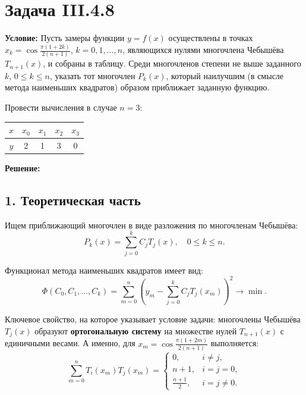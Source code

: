 \documentclass{article}
\begin{document}
\section*{Задача III.4.8}

\textbf{Условие:} Пусть замеры функции $y = f(x)$ осуществлены в точках $x_k = \cos\frac{\pi(1+2k)}{2(n+1)}$, $k = 0, 1, \ldots, n$, являющихся нулями многочлена Чебышёва $T_{n+1}(x)$, и собраны в таблицу. Среди многочленов степени не выше заданного $k$, $0 \le k \le n$, указать тот многочлен $P_k(x)$, который наилучшим (в смысле метода наименьших квадратов) образом приближает заданную функцию.

Провести вычисления в случае $n = 3$:

\begin{center}
\begin{tabular}{|c|c|c|c|c|}
\hline
$x$ & $x_0$ & $x_1$ & $x_2$ & $x_3$ \\
\hline
$y$ & 2 & 1 & 3 & 0 \\
\hline
\end{tabular}
\end{center}

\vspace{0.5cm}
\textbf{Решение:}

\subsection*{1. Теоретическая часть}

Ищем приближающий многочлен в виде разложения по многочленам Чебышёва:
\begin{equation}
P_k(x) = \sum_{j=0}^{k} C_j T_j(x), \quad 0 \le k \le n.
\label{eq:48_pk}
\end{equation}

Функционал метода наименьших квадратов имеет вид:
\begin{equation}
\Phi(C_0, C_1, \ldots, C_k) = \sum_{m=0}^{n} \left(y_m - \sum_{j=0}^{k} C_j T_j(x_m)\right)^2 \to \min.
\end{equation}

Ключевое свойство, на которое указывает условие задачи: многочлены Чебышёва $T_j(x)$ образуют \textbf{ортогональную систему} на множестве нулей $T_{n+1}(x)$ с единичными весами. А именно, для $x_m = \cos\frac{\pi(1+2m)}{2(n+1)}$ выполняется:
\begin{equation}
\sum_{m=0}^{n} T_i(x_m) T_j(x_m) = 
\begin{cases} 
0, & i \neq j, \\
n+1, & i = j = 0, \\
\frac{n+1}{2}, & i = j \neq 0.
\end{cases}
\label{eq:48_orth}
\end{equation}
\end{document}
